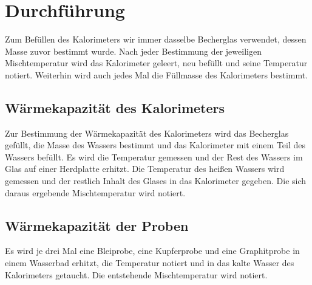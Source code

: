 
\section{Durchführung}
\label{sec:Durchführung}

Zum Befüllen des Kalorimeters wir immer dasselbe Becherglas verwendet, dessen Masse zuvor bestimmt wurde. Nach jeder Bestimmung der jeweiligen Mischtemperatur wird das Kalorimeter geleert, neu befüllt und seine Temperatur notiert. Weiterhin wird auch jedes Mal die Füllmasse des Kalorimeters bestimmt.
\subsection{Wärmekapazität des Kalorimeters}
Zur Bestimmung der Wärmekapazität des Kalorimeters wird das Becherglas gefüllt, die Masse des Wassers bestimmt und das Kalorimeter mit einem Teil des Wassers befüllt. Es wird die Temperatur gemessen und der Rest des Wassers im Glas auf einer Herdplatte erhitzt. Die Temperatur des heißen Wassers wird gemessen und der restlich Inhalt des Glases in das Kalorimeter gegeben. Die sich daraus ergebende Mischtemperatur wird notiert.
\subsection{Wärmekapazität der Proben}
Es wird je drei Mal eine Bleiprobe, eine Kupferprobe und eine Graphitprobe in einem Wasserbad erhitzt, die Temperatur notiert und in das kalte Wasser des Kalorimeters getaucht. Die entstehende Mischtemperatur wird notiert.
